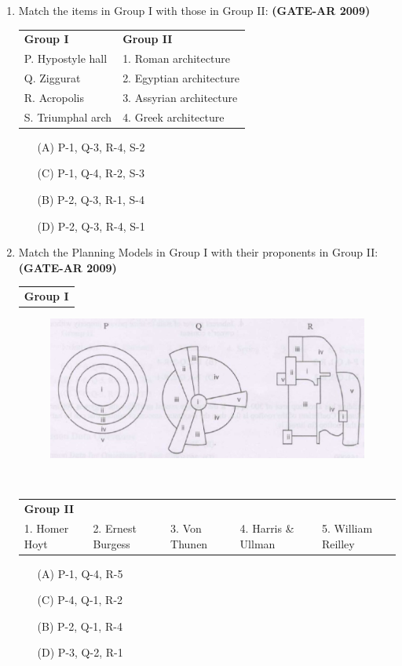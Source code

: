 \documentclass[a4paper,10pt]{article}
\begin{document}
\begin{enumerate}
    \item Match the items in Group I with those in Group II: \hfill \textbf{(GATE-AR 2009)} \\
    \begin{tabular}{ p p }
	\textbf{Group I} & \textbf{Group II} \\
	P. Hypostyle hall & 1. Roman architecture \\
	Q. Ziggurat & 2. Egyptian architecture \\
	R. Acropolis & 3. Assyrian architecture \\
	S. Triumphal arch & 4. Greek architecture \\
	\end{tabular}
	\begin{multicols}{2}
	\begin{itemize}
        \item[(A)] P-1, Q-3, R-4, S-2
        \item[(C)] P-1, Q-4, R-2, S-3
        \item[(B)] P-2, Q-3, R-1, S-4
        \item[(D)] P-2, Q-3, R-4, S-1
    \end{itemize}
	\end{multicols}

    \item Match the Planning Models in Group I with their proponents in Group II: \hfill \textbf{(GATE-AR 2009)} \\
    \begin{tabular}{ p }
	\textbf{Group I} \\
	\end{tabular}
	\begin{figure}[h!]
        \centering
        \includegraphics[width=0.5\linewidth]{figs/img_03.jpg}
        \label{fig:Img03}
	\end{figure} \\
	\begin{tabular}{ p p p p p }
	\textbf{Group II} & & \\
	1. Homer Hoyt & 2. Ernest Burgess & 3. Von Thunen & 4. Harris \& Ullman & 5. William Reilley \\
	\end{tabular}
	\begin{multicols}{2}
	\begin{itemize}
        \item[(A)] P-1, Q-4, R-5
        \item[(C)] P-4, Q-1, R-2
        \item[(B)] P-2, Q-1, R-4
        \item[(D)] P-3, Q-2, R-1
    \end{itemize}
	\end{multicols}


\end{enumerate}
\end{document}
